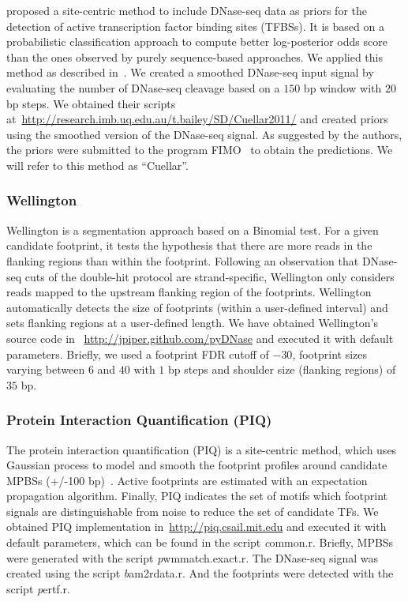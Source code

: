 \documentclass[11pt]{article}
\begin{document}
\cite{cuellar2012} proposed a site-centric method to include DNase-seq data as priors for the detection of active transcription factor binding sites (TFBSs). It is based on a probabilistic classification approach to compute better log-posterior odds score than the ones observed by purely sequence-based approaches. We applied this method as described in~\cite{cuellar2012}. We created a smoothed DNase-seq input signal by evaluating the number of DNase-seq cleavage based on a $150$ bp window with $20$ bp steps. We obtained their scripts at~\url{http://research.imb.uq.edu.au/t.bailey/SD/Cuellar2011/} and created priors using the smoothed version of the DNase-seq signal. As suggested by the authors, the priors were submitted to the program FIMO~\citep{grant2011} to obtain the predictions. We will refer to this method as ``Cuellar''.

\subsubsection{Wellington}
\label{sec:wellington}

Wellington is a segmentation approach based on a Binomial test. For a given candidate footprint, it tests the hypothesis that there are more reads in the flanking regions than within the footprint. Following an observation that DNase-seq cuts of the double-hit protocol are strand-specific, Wellington only considers reads mapped to the upstream flanking region of the footprints. Wellington automatically detects the size of footprints (within a user-defined interval) and sets flanking regions at a user-defined length. We have obtained Wellington's source code in ~\url{http://jpiper.github.com/pyDNase} and executed it with default parameters. Briefly, we used a footprint FDR cutoff of $-30$, footprint sizes varying between $6$ and $40$ with $1$ bp steps and shoulder size (flanking regions) of $35$ bp.

\subsubsection{Protein Interaction Quantification (PIQ)}
\label{sec:piq}

The protein interaction quantification (PIQ) is a site-centric method, which uses Gaussian process to model and smooth the footprint profiles around candidate MPBSs (+/-100 bp)~\citep{sherwood2014}. Active footprints are estimated with an expectation propagation algorithm. Finally, PIQ indicates the set of motifs which footprint signals are distinguishable from noise to reduce the set of candidate TFs. We obtained PIQ implementation in~\url{http://piq.csail.mit.edu} and executed it with default parameters, which can be found in the script {\emph common.r}. Briefly, MPBSs were generated with the script {\emph pwmmatch.exact.r}. The DNase-seq signal was created using the script {\emph bam2rdata.r}. And the footprints were detected with the script {\emph pertf.r}.
\end{document}
